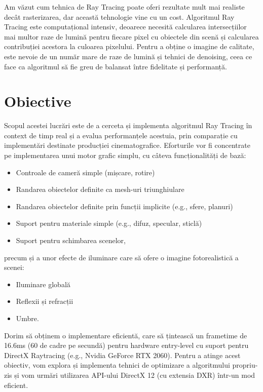 \documentclass[12pt,a4paper]{report}
\begin{document}
Am văzut cum tehnica de Ray Tracing poate oferi rezultate mult mai realiste
decât rasterizarea, dar această tehnologie vine cu un cost.
Algoritmul Ray Tracing este computațional intensiv, deoarece necesită
calcularea intersecțiilor mai multor raze de lumină pentru fiecare pixel cu obiectele din scenă
și calcularea contribuției acestora la culoarea pixelului. Pentru a obține o imagine
de calitate, este nevoie de un număr mare de raze de lumină și tehnici de denoising,
ceea ce face ca algoritmul să fie greu de balansat între fidelitate și performanță.

\section{Obiective}

Scopul acestei lucrări este de a cerceta și implementa algoritmul Ray Tracing în
context de timp real și a evalua performanțele acestuia, prin comparație cu
implementări destinate producției cinematografice. Eforturile vor fi concentrate
pe implementarea unui motor grafic simplu, cu câteva funcționalități de bază:
\begin{itemize}
	\item Controale de cameră simple (mișcare, rotire)
	\item Randarea obiectelor definite ca mesh-uri triunghiulare
	\item Randarea obiectelor definite prin funcții implicite (e.g., sfere, planuri)
	\item Suport pentru materiale simple (e.g., difuz, specular, sticlă)
	\item Suport pentru schimbarea scenelor,
\end{itemize}
precum și a unor efecte de iluminare care să ofere o imagine fotorealistică a scenei:
\begin{itemize}
	\item Iluminare globală
	\item Reflexii și refracții
	\item Umbre.
\end{itemize}
Dorim să obținem o implementare eficientă, care să țintească un frametime de 16.6ms
(60 de cadre pe secundă) pentru hardware entry-level cu suport pentru
DirectX Raytracing (e.g., Nvidia GeForce RTX 2060). Pentru a atinge acest obiectiv,
vom explora și implementa tehnici de optimizare a algoritmului propriu-zis și vom
urmări utilizarea API-ului DirectX 12 (cu extensia DXR) într-un mod eficient.
\end{document}
